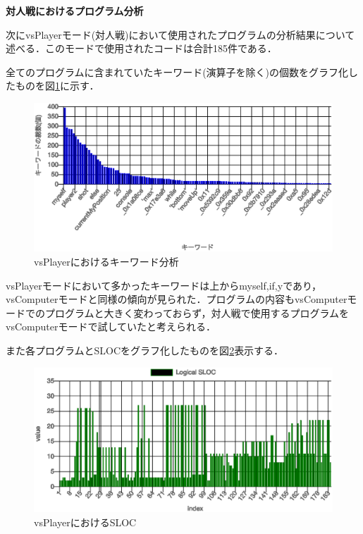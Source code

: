 {\bf 対人戦におけるプログラム分析}

次にvsPlayerモード(対人戦)において使用されたプログラムの分析結果について述べる．このモードで使用されたコードは合計185件である．

全てのプログラムに含まれていたキーワード(演算子を除く)の個数をグラフ化したものを図\ref{vsPlayer_keyword}に示す．

\begin{figure}[!htb]
  \begin{center}
    \includegraphics[width=0.9\linewidth]{image/vsPlayer_keyword.eps}
  \end{center}
    \vspace{-8mm} 
  \caption{vsPlayerにおけるキーワード分析}
  \label{vsPlayer_keyword}
\end{figure}

vsPlayerモードにおいて多かったキーワードは上からmyself,if,yであり，vsComputerモードと同様の傾向が見られた．プログラムの内容もvsComputerモードでのプログラムと大きく変わっておらず，対人戦で使用するプログラムをvsComputerモードで試していたと考えられる．

また各プログラムとSLOCをグラフ化したものを図\ref{vsPlayer_sloc_and_params}表示する．

\begin{figure}[!htb]
  \begin{center}
    \includegraphics[width=0.9\linewidth]{image/vsPlayer_sloc.eps}
  \end{center}
    \vspace{-8mm} 
  \caption{vsPlayerにおけるSLOC}
  \label{vsPlayer_sloc_and_params}
\end{figure}

